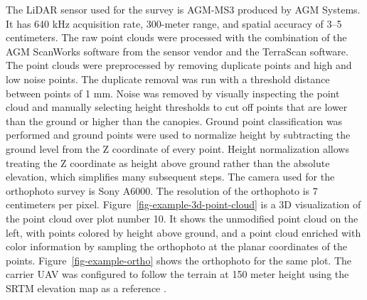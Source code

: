 The LiDAR sensor used for the survey is AGM-MS3 produced by AGM Systems.
It has 640 kHz acquisition rate, 300-meter range, and spatial accuracy of 3–5 centimeters.
The raw point clouds were processed with the combination of the AGM ScanWorks software from the sensor vendor and the TerraScan software.
The point clouds were preprocessed by removing duplicate points and high and low noise points.
The duplicate removal was run with a threshold distance between points of 1 mm.
Noise was removed by visually inspecting the point cloud and manually selecting height thresholds to cut off points that are lower than the ground or higher than the canopies.
Ground point classification was performed and ground points were used to normalize height by subtracting the ground level from the Z coordinate of every point.
Height normalization allows treating the Z coordinate as height above ground rather than the absolute elevation, which simplifies many subsequent steps.
The camera used for the orthophoto survey is Sony A6000.
The resolution of the orthophoto is 7 centimeters per pixel.
Figure~\ref{fig-example-3d-point-cloud} is a 3D visualization of the point cloud over plot number 10.
It shows the unmodified point cloud on the left, with points colored by height above ground, and a point cloud enriched with color information by sampling the orthophoto at the planar coordinates of the points.
Figure~\ref{fig-example-ortho} shows the orthophoto for the same plot.
The carrier UAV was configured to follow the terrain at 150 meter height using the SRTM elevation map as a reference \citep{farrShuttleRadarTopography2000}.

